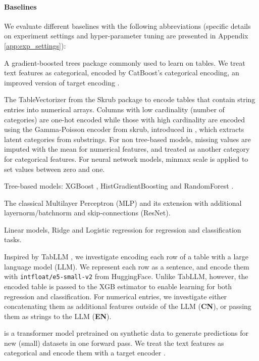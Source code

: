 \documentclass{article}
\theoremstyle{plain}
\theoremstyle{definition}
\theoremstyle{remark}
\begin{document}
\paragraph{Baselines} We evaluate different baselines with the following abbreviations (specific details on experiment settings and hyper-parameter tuning are presented in Appendix \ref{app:exp_settings}):

\begin{description}[itemsep=1pt, parsep=1pt, topsep=1pt]
    \item[CatBoost] \citep{dorogushCatboost2018} A gradient-boosted trees package commonly used to learn on tables. We treat text features as categorical, encoded by CatBoost's categorical encoding, an improved version of target encoding \citep{micci2001preprocessing}.
    \item[TabVec] The TableVectorizer from the Skrub package \citep{skrub2024} to encode tables that contain string entries into numerical arrays. Columns with low cardinality (number of categories) are one-hot encoded while those with high cardinality are encoded using the Gamma-Poisson encoder from skrub, introduced in \citet{cerdaEncodingHighcardinalityString2022}, which extracts latent categories from substrings. For non tree-based models, missing values are imputed with the mean for numerical features, and treated as another category for categorical features. For neural network models, minmax scale is applied to set values between zero and one.
    \item[XGB, HGB, and RF] Tree-based models: XGBoost \citep{chen2016xgboost}, HistGradientBoosting and RandomForest \citep[from scikit-learn, ][]{pedregosa2011scikit}.
    \item[MLP and ResNet] The classical Multilayer Perceptron (MLP) and its extension with additional layernorm/batchnorm and skip-connections (ResNet).
    \item[Ridge and Logistic] Linear models, Ridge and Logistic regression for regression and classification tasks.
    \item[\textbf{S-LLM}] Inspired by TabLLM  \citep{hegselmannTabLLMFewshotClassification2023}, we investigate encoding each row of a table with a large language model (LLM). We represent each row as a sentence, and encode them with {\tt intfloat/e5-small-v2} \citep{wang2022text} from HuggingFace. Unlike TabLLM, however, the encoded table is passed to the XGB estimator to enable learning for both regression and classification. For numerical entries, we investigate either concatenating them as additional features outside of the LLM (\textbf{CN}), or passing them as strings to the LLM (\textbf{EN}).
    \item[\textbf{TabPFN}] \citep{hollmannTabPFNTransformerThat2023} is a transformer model pretrained on synthetic data to generate predictions for new (small) datasets in one forward pass. We treat the text features as categorical and encode them with a target encoder \citep{micci2001preprocessing}.
\end{description}
\end{document}
